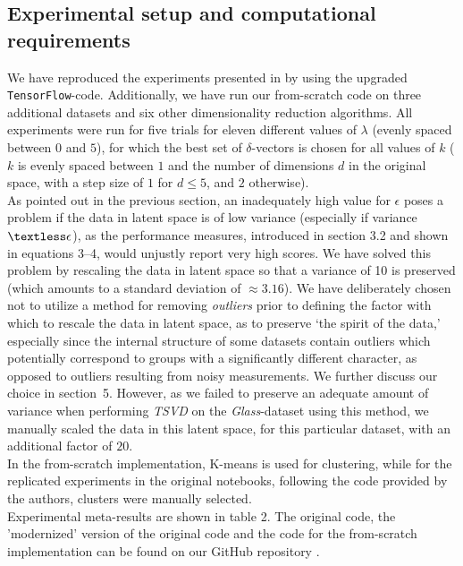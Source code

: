 \subsection{Experimental setup and computational requirements}
We have reproduced the experiments presented in \cite{plumb2020explaining} by using the upgraded \texttt{TensorFlow}-code. Additionally, we have run our from-scratch code on three additional datasets and six other dimensionality reduction algorithms. All experiments were run for five trials for eleven different values of $\lambda$ (evenly spaced between $0$ and $5$), for which the best set of $\delta$-vectors is chosen for all values of $k$ ($k$ is evenly spaced between $1$ and the number of dimensions $d$ in the original space, with a step size of $1$ for $d \leq 5$, and $2$ otherwise).\\
    
As pointed out in the previous section, an inadequately high value for $\epsilon$ poses a problem if the data in latent space is of low variance (especially if variance $\textless \epsilon$), as the performance measures, introduced in section 3.2 and shown in equations 3--4, would unjustly report very high scores. We have solved this problem by rescaling the data in latent space so that a variance of 10 is preserved (which amounts to a standard deviation of $\approx 3.16$). We have deliberately chosen not to utilize a method for removing \textit{outliers} prior to defining the factor with which to rescale the data in latent space, as to preserve `the spirit of the data,' especially since the internal structure of some datasets contain outliers which potentially correspond to groups with a significantly different character, as opposed to outliers resulting from noisy measurements. We further discuss our choice in section~5. However, as we failed to preserve an adequate amount of variance when performing \textit{TSVD} on the \textit{Glass}-dataset using this method, we manually scaled the data in this latent space, for this particular dataset, with an additional factor of $20$.\\

In the from-scratch implementation, K-means is used for clustering, while for the replicated experiments in the original notebooks, following the code provided by the authors, clusters were manually selected.\\

Experimental meta-results are shown in table 2. The original code, the 'modernized' version of the original code and the code for the from-scratch implementation can be found on our GitHub repository \cite{damiaan_j_w_reijnaers_2021_4686025}.

